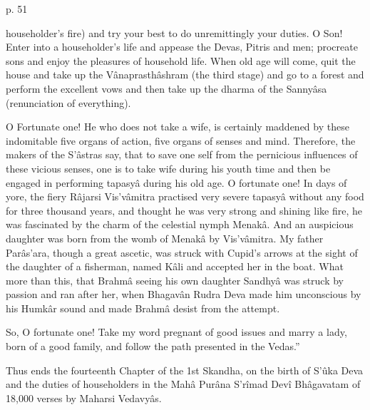  

p. 51

 

householder's fire) and try your best to do unremittingly your duties. O Son! Enter into a householder's life and appease the Devas, Pitris and men; procreate sons and enjoy the pleasures of household life. When old age will come, quit the house and take up the Vânaprasthâshram (the third stage) and go to a forest and perform the excellent vows and then take up the dharma of the Sannyâsa (renunciation of everything).

 

O Fortunate one! He who does not take a wife, is certainly maddened by these indomitable five organs of action, five organs of senses and mind. Therefore, the makers of the S’âstras say, that to save one self from the pernicious influences of these vicious senses, one is to take wife during his youth time and then be engaged in performing tapasyâ during his old age. O fortunate one! In days of yore, the fiery Râjarsi Vis'vâmitra practised very severe tapasyâ without any food for three thousand years, and thought he was very strong and shining like fire, he was fascinated by the charm of the celestial nymph Menakâ. And an auspicious daughter was born from the womb of Menakâ by Vis'vâmitra. My father Parâs'ara, though a great ascetic, was struck with Cupid's arrows at the sight of the daughter of a fisherman, named Kâli and accepted her in the boat. What more than this, that Brahmâ seeing his  own daughter Sandhyâ was struck by passion and ran after her, when Bhagavân Rudra Deva made him unconscious by his Humkâr sound and made Brahmâ desist from the attempt.

 

 So, O fortunate one! Take my word pregnant of good issues and marry a lady, born of a good family, and follow the path presented in the Vedas.”

 

Thus ends the fourteenth Chapter of the 1st Skandha, on the birth of S’ûka Deva and the duties of householders in the Mahâ Purâna S'rîmad Devî Bhâgavatam of 18,000 verses by Maharsi Vedavyâs.

